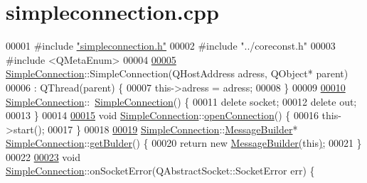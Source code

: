 \hypertarget{a00005_source}{}\section{simpleconnection.\+cpp}
\label{a00005_source}

\begin{DoxyCode}
00001 \textcolor{preprocessor}{#}\textcolor{preprocessor}{include} \hyperlink{a00008}{"simpleconnection.h"}
00002 \textcolor{preprocessor}{#}\textcolor{preprocessor}{include} \textcolor{preprocessor}{"../coreconst.h"}
00003 \textcolor{preprocessor}{#}\textcolor{preprocessor}{include} \textcolor{preprocessor}{<}\textcolor{preprocessor}{QMetaEnum}\textcolor{preprocessor}{>}
00004 
\hyperlink{a00125_a2bcb23e4dcb42f9149d6c66b326fc475}{00005} \hyperlink{a00125_a8360af71c89a54be93430b746d5fae08}{SimpleConnection}::SimpleConnection(QHostAddress adress, QObject* parent)
00006     : QThread(parent) \{
00007   \textcolor{keyword}{this}->adress = adress;
00008 \}
00009 
\hyperlink{a00125_a61b33627900c86ffa7f7936acae2873a}{00010} \hyperlink{a00125_a8360af71c89a54be93430b746d5fae08}{SimpleConnection}::~\hyperlink{a00125_a61b33627900c86ffa7f7936acae2873a}{SimpleConnection}() \{
00011   \textcolor{keyword}{delete} socket;
00012   \textcolor{keyword}{delete} out;
00013 \}
00014 
\hyperlink{a00125_a47370c85490330b8e1dd64af9e70b683}{00015} \textcolor{keywordtype}{void} \hyperlink{a00125_a8360af71c89a54be93430b746d5fae08}{SimpleConnection}::\hyperlink{a00125_a47370c85490330b8e1dd64af9e70b683}{openConnection}() \{
00016   \textcolor{keyword}{this}->start();
00017 \}
00018 
\hyperlink{a00125_a2bbd5504e2e67fa95a701f77cd438f4d}{00019} \hyperlink{a00125_a8360af71c89a54be93430b746d5fae08}{SimpleConnection}::\hyperlink{a00129}{MessageBuilder}* 
      \hyperlink{a00125_a8360af71c89a54be93430b746d5fae08}{SimpleConnection}::\hyperlink{a00125_a2bbd5504e2e67fa95a701f77cd438f4d}{getBulder}() \{
00020   \textcolor{keywordflow}{return} \textcolor{keyword}{new} \hyperlink{a00129}{MessageBuilder}\hyperlink{a00129_a872f905bf802df170dc7d1e0e9e75105}{(}\textcolor{keyword}{this}\hyperlink{a00129_a872f905bf802df170dc7d1e0e9e75105}{)};
00021 \}
00022 
\hyperlink{a00125_a8360af71c89a54be93430b746d5fae08}{00023} \textcolor{keywordtype}{void} \hyperlink{a00125_a8360af71c89a54be93430b746d5fae08}{SimpleConnection}::onSocketError(QAbstractSocket::SocketError err) \{

\end{DoxyCode}
